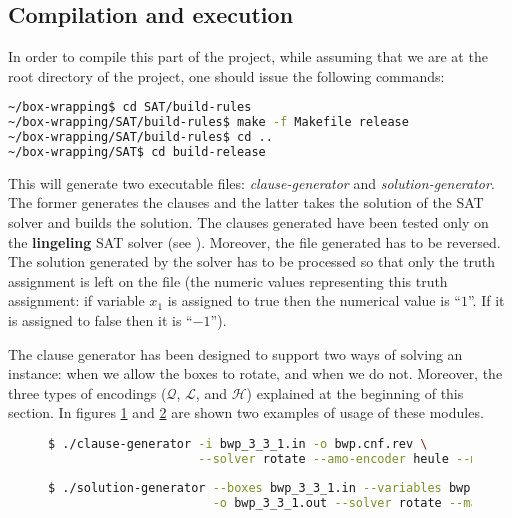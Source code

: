\subsection{Compilation and execution}
\label{sec:satisfiability:compilation-execution}

In order to compile this part of the project, while assuming that we are at the
root directory of the project, one should issue the following commands:
\begin{lstlisting}[language=bash]
~/box-wrapping$ cd SAT/build-rules
~/box-wrapping/SAT/build-rules$ make -f Makefile release
~/box-wrapping/SAT/build-rules$ cd ..
~/box-wrapping/SAT$ cd build-release
\end{lstlisting}

This will generate two executable files: \textit{clause-generator} and
\textit{solution-generator}. The former generates the clauses and the latter
takes the solution of the SAT solver and builds the solution. The clauses generated
have been tested only on the \textbf{lingeling} SAT solver (see \cite{lingeling}).
Moreover, the file generated has to be reversed. The solution generated by the solver
has to be processed so that only the truth assignment is left on the file (the numeric
values representing this truth assignment: if variable $x_1$ is assigned to true
then the numerical value is ``$1$''. If it is assigned to false then it is ``$-1$'').

\hfill

The clause generator has been designed to support two ways of solving an instance:
when we allow the boxes to rotate, and when we do not. Moreover, the three types of
encodings ($\mathcal{Q}$, $\mathcal{L}$, and $\mathcal{H}$) explained at the beginning
of this section. In figures \ref{fig:satisfiability:clause-generator} and
\ref{fig:satisfiability:solution-generator} are shown two examples of usage of these
modules.

\begin{figure}[H]
\centering
\begin{lstlisting}[language=bash,basicstyle=\centering]
$ ./clause-generator -i bwp_3_3_1.in -o bwp.cnf.rev \
					 --solver rotate --amo-encoder heule --max-L 1
\end{lstlisting}
\label{fig:satisfiability:clause-generator}
\end{figure}

\begin{figure}[H]
\centering
\begin{lstlisting}[language=bash,basicstyle=\centering]
$ ./solution-generator --boxes bwp_3_3_1.in --variables bwp.vars \
					   -o bwp_3_3_1.out --solver rotate --max-L 1
\end{lstlisting}
\label{fig:satisfiability:solution-generator}
\end{figure}

